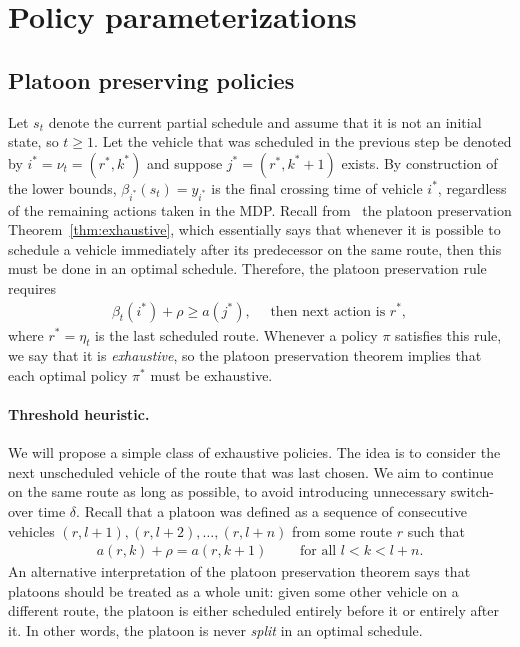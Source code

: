 \documentclass[a4paper]{report}
\theoremstyle{definition}
\theoremstyle{plain}
\begin{document}
\section{Policy parameterizations}
\subsection{Platoon preserving policies}

Let $s_t$ denote the current partial schedule and assume that it is
not an initial state, so $t \geq 1$. Let the vehicle that was scheduled in the
previous step be denoted by $i^* = \nu_t = (r^*, k^*)$ and suppose $j^* = (r^*, k^*+1)$ exists.
%
By construction of the lower bounds, $\beta_{i^*}(s_t) = y_{i^*}$ is the final crossing
time of vehicle $i^*$, regardless of the remaining actions taken in the MDP.
%
Recall from~ the platoon preservation
Theorem~\ref{thm:exhaustive}, which essentially says that whenever it is
possible to schedule a vehicle immediately after its predecessor on the same
route, then this must be done in an optimal schedule.
%
Therefore, the platoon preservation rule requires
\begin{align}\label{eq:rule-exhaustive}\tag{exhaustive}
  \beta_t(i^*) + \rho \geq a(j^*), \quad \text{  then next action is } r^* , 
\end{align}
where $r^* = \eta_t$ is the last scheduled route.
%
Whenever a policy $\pi$ satisfies this rule, we say that it is
\emph{exhaustive}, so the platoon preservation theorem implies that each optimal
policy $\pi^*$ must be exhaustive.


\paragraph{Threshold heuristic.}

We will propose a simple class of exhaustive policies.
%
The idea is to consider the next unscheduled vehicle of the route that was
last chosen. We aim to continue on the same route as long as
possible, to avoid introducing unnecessary switch-over time $\delta$.
%
Recall that a platoon was defined as a sequence of consecutive vehicles
$(r, l+1), (r, l+2), \dots, (r, l+n)$ from some route $r$ such that
\begin{align*}
  a(r,k) + \rho = a(r, k+1)  \quad \quad \text{ for all } l < k < l + n.
\end{align*}
%
An alternative interpretation of the platoon preservation theorem says that
platoons should be treated as a whole unit: given some other vehicle on a
different route, the platoon is either scheduled entirely before it or entirely
after it. In other words, the platoon is never \emph{split} in an optimal
schedule.
\end{document}
